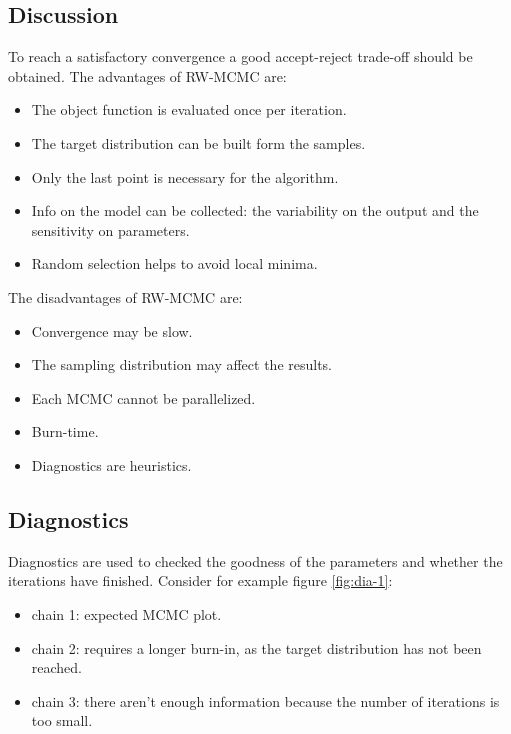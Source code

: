   

  \subsection{Discussion}
  To reach a satisfactory convergence a good accept-reject trade-off should be obtained.
  The advantages of RW-MCMC are:

  \begin{multicols}{2}
    \begin{itemize}
      \item The object function is evaluated once per iteration.
      \item The target distribution can be built form the samples.
      \item Only the last point is necessary for the algorithm.
      \item Info on the model can be collected: the variability on the output and the sensitivity on parameters.
      \item Random selection helps to avoid local minima.
    \end{itemize}
  \end{multicols}

  The disadvantages of RW-MCMC are:

  \begin{multicols}{2}
    \begin{itemize}
      \item Convergence may be slow.
      \item The sampling distribution may affect the results.
      \item Each MCMC cannot be parallelized.
      \item Burn-time.
      \item Diagnostics are heuristics.
    \end{itemize}
  \end{multicols}

  \subsection{Diagnostics}
  Diagnostics are used to checked the goodness of the parameters and whether the iterations have finished.
  Consider for example figure \ref{fig:dia-1}:

  \begin{multicols}{2}
    \begin{itemize}
      \item chain 1: expected MCMC plot.
      \item chain 2: requires a longer burn-in, as the target distribution has not been reached.
      \item chain 3: there aren't enough information because the number of iterations is too small.
    \end{itemize}
  \end{multicols}

